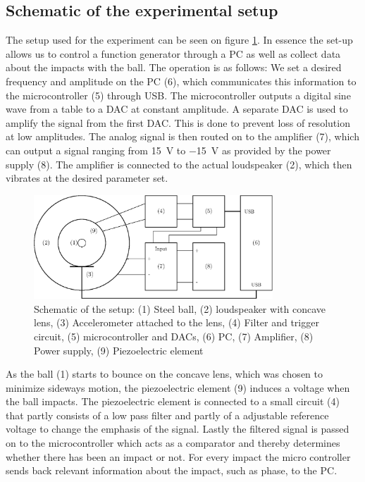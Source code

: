 \documentclass[12pt,oneside,a4paper]{article}
\numberwithin{equation}{section}
\begin{document}
{{{{\subsection{Schematic of the experimental setup}
The setup used for the experiment can be seen on figure \ref{setupdia}. In 
essence the set-up allows us to control a function generator through a PC as 
well as collect data about the impacts with the ball. The operation is as 
follows: We set a desired frequency and amplitude on the PC (6), which 
communicates this information to the microcontroller (5) through USB. The 
microcontroller outputs a digital sine wave from a table to a DAC at constant 
amplitude. A separate DAC is used to amplify the signal from the first DAC. 
This is done to prevent loss of resolution at low amplitudes. The analog signal 
is then routed on to the amplifier (7), which can output a signal ranging from 
\SI{+15}{V} to \SI{-15}{V} as provided by the power supply (8). The amplifier 
is connected to the actual loudspeaker (2), which then vibrates at the 
desired parameter set.
\begin{figure}[h]
	\centering
	\includegraphics[width=0.8\textwidth]{setup}
	\caption{Schematic of the setup: (1) Steel ball, (2) loudspeaker with concave lens, (3) Accelerometer attached to the lens, (4) Filter and trigger circuit, (5) microcontroller and DACs, (6) PC, (7) Amplifier, (8) Power supply, (9) Piezoelectric element}
	\label{setupdia}
\end{figure}
As the ball (1) starts to bounce on the concave lens, which was chosen to 
minimize sideways motion, the piezoelectric element (9) induces a voltage when 
the ball impacts. The piezoelectric element is connected to a small circuit (4) 
that partly consists of a low pass filter and partly of a adjustable reference 
voltage to change the emphasis of the signal. Lastly the filtered signal is 
passed on to the microcontroller which acts as a comparator and thereby 
determines whether there has been an impact or not. For every impact the micro 
controller sends back relevant information about the impact, such as phase, to 
the PC.

}}}}
\end{document}
